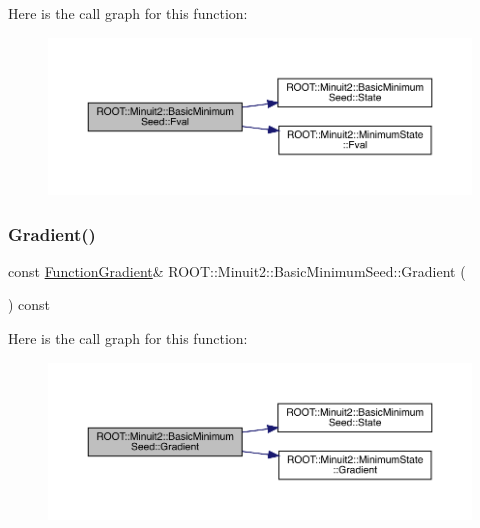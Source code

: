 Here is the call graph for this function\+:
\nopagebreak
\begin{figure}[H]
\begin{center}
\leavevmode
\includegraphics[width=350pt]{de/d50/classROOT_1_1Minuit2_1_1BasicMinimumSeed_a40b43b611717121256cd72bf40a3d5d7_cgraph}
\end{center}
\end{figure}
\mbox{\label{classROOT_1_1Minuit2_1_1BasicMinimumSeed_ab61377b63a177c93629ccb3e69e173db}} 
\subsubsection{\texorpdfstring{Gradient()}{Gradient()}\hspace{0.1cm}{\footnotesize\ttfamily [1/3]}}
{\footnotesize\ttfamily const \mbox{\hyperlink{classROOT_1_1Minuit2_1_1FunctionGradient}{Function\+Gradient}}\& R\+O\+O\+T\+::\+Minuit2\+::\+Basic\+Minimum\+Seed\+::\+Gradient (\begin{DoxyParamCaption}{ }\end{DoxyParamCaption}) const\hspace{0.3cm}{\ttfamily [inline]}}

Here is the call graph for this function\+:
\nopagebreak
\begin{figure}[H]
\begin{center}
\leavevmode
\includegraphics[width=350pt]{de/d50/classROOT_1_1Minuit2_1_1BasicMinimumSeed_ab61377b63a177c93629ccb3e69e173db_cgraph}
\end{center}
\end{figure}
\mbox{\label{classROOT_1_1Minuit2_1_1BasicMinimumSeed_ab61377b63a177c93629ccb3e69e173db}} 
